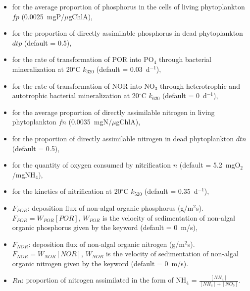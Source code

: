 \begin{itemize}
\item {}
  for the average proportion of phosphorus in the cells of living phytoplankton $fp$ (0.0025~mgP/$\mu$gChlA),
\item {}
  for the proportion of directly assimilable phosphorus in dead phytoplankton $dtp$ (default = 0.5),
\item {}
  for the rate of transformation of POR into PO$_4$ through bacterial mineralization at 20$^{\circ}$C
  $k_{320}$ (default = 0.03~d$^{-1}$),
\item {}
  for the rate of transformation of NOR into NO$_3$ through heterotrophic
  and autotrophic bacterial mineralization at 20$^{\circ}$C $k_{620}$ (default = 0~d$^{-1}$),
\item {}
  for the average proportion of directly assimilable nitrogen in living phytoplankton $fn$ (0.0035~mgN/$\mu$gChlA),
\item {}
  for the proportion of directly assimilable nitrogen in dead phytoplankton $dtn$ (default = 0.5),
\item {}
  for the quantity of oxygen consumed by nitrification $n$ (default = 5.2~mgO$_2$/mgNH$_4$),
\item {}
  for the kinetics of nitrification at 20$^{\circ}$C $k_{520}$ (default = 0.35~d$^{-1}$),
\item $F_{POR}$: deposition flux of non-algal organic phosphorus (g/m$^2$s).
  $F_{POR} = W_{POR} [POR]$,
  $W_{POR}$ is the velocity of sedimentation of non-algal organic phosphorus
  given by the keyword 
  (default = 0~m/s),
\item $F_{NOR}$: deposition flux of non-algal organic nitrogen (g/m$^2$s).
  $F_{NOR} = W_{NOR} [NOR]$, $W_{NOR}$ is the velocity of sedimentation of non-algal organic nitrogen
  given by the keyword 
  (default = 0~m/s).

\item $Rn$: proportion of nitrogen assimilated in the form of NH$_4$ = $\frac{[NH_4]}{[NH_4]+[NO_3]}$.
\end{itemize}

